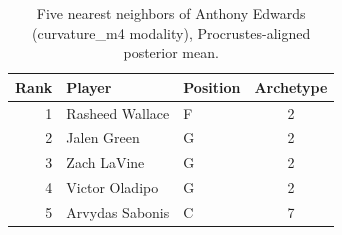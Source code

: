 \begin{table}[htbp]
  \centering\small
  \begin{tabular}{rllc}
    \toprule
    Rank & Player & Position & Archetype \\
    \midrule
    1 & Rasheed Wallace & F & 2 \\
    2 & Jalen Green & G & 2 \\
    3 & Zach LaVine & G & 2 \\
    4 & Victor Oladipo & G & 2 \\
    5 & Arvydas Sabonis & C & 7 \\
    \bottomrule
  \end{tabular}
  \caption{Five nearest neighbors of Anthony Edwards (curvature_m4 modality), Procrustes-aligned posterior mean.}
  \label{tab:Anthony_Edwards_neighbors_curvature_m4}
\end{table}

